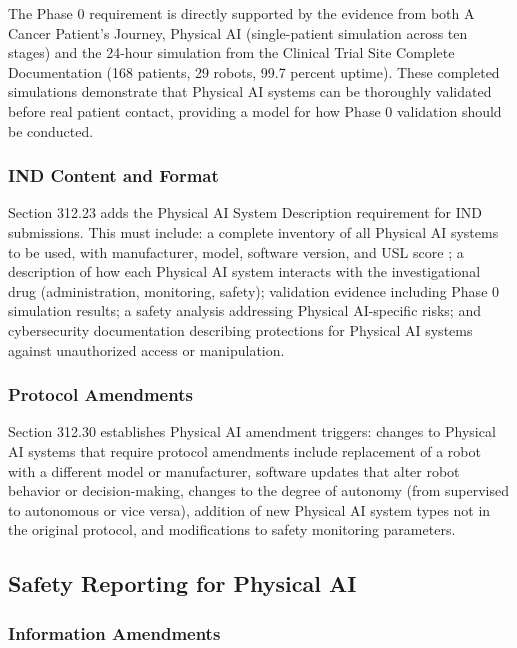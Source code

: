 The Phase 0 requirement is directly supported by the evidence from both A
Cancer Patient's Journey, Physical AI \cite{patient-journey-paper}
(single-patient simulation across ten stages) and the 24-hour simulation from
the Clinical Trial Site Complete Documentation \cite{site-docs} (168 patients,
29 robots, 99.7 percent uptime). These completed simulations demonstrate that
Physical AI systems can be thoroughly validated before real patient contact,
providing a model for how Phase 0 validation should be conducted.

\subsubsection{IND Content and Format}

Section 312.23 adds the Physical AI System Description requirement for IND
submissions. This must include: a complete inventory of all Physical AI systems
to be used, with manufacturer, model, software version, and USL score
\cite{usl-standard}; a description of how each Physical AI system interacts
with the investigational drug (administration, monitoring, safety); validation
evidence including Phase 0 simulation results; a safety analysis addressing
Physical AI-specific risks; and cybersecurity documentation describing
protections for Physical AI systems against unauthorized access or manipulation.

\subsubsection{Protocol Amendments}

Section 312.30 establishes Physical AI amendment triggers: changes to Physical
AI systems that require protocol amendments include replacement of a robot with
a different model or manufacturer, software updates that alter robot behavior
or decision-making, changes to the degree of autonomy (from supervised to
autonomous or vice versa), addition of new Physical AI system types not in the
original protocol, and modifications to safety monitoring parameters.

\subsection{Safety Reporting for Physical AI}
\label{subsec:cfr312-safety}

\subsubsection{Information Amendments}

